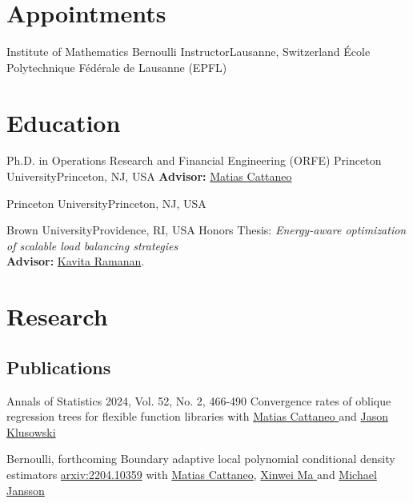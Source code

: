 \documentclass[10pt,a4paper,roman]{moderncv}        %
\begin{document}
\makecvtitle

\vspace{-0.7cm}
\section{Appointments}
{Institute of Mathematics}
{Bernoulli Instructor}{Lausanne, Switzerland}
{École Polytechnique Fédérale de Lausanne (EPFL)}
{}
\section{Education}
{Ph.D. in Operations Research and Financial Engineering (ORFE)}
{Princeton University}{Princeton, NJ, USA}{}
{\textbf{Advisor: }\color{blue}\href{https://cattaneo.princeton.edu}{Matias Cattaneo}\color{black}}

{Princeton University}{Princeton, NJ, USA}{}{}

{Brown University}{Providence, RI, USA}{}{ Honors Thesis: \textit{Energy-aware optimization of scalable load balancing
    strategies}
  \\
  \textbf{Advisor:}
  \color{blue}\href{https://www.brown.edu/academics/applied-mathematics/faculty/kavita-ramanan/home}
  {Kavita Ramanan}\color{black}.}  %

\section{Research}
\subsection{Publications}
\cventry{}
{Annals of Statistics 2024, Vol. 52, No. 2, 466-490}
{Convergence rates of oblique regression trees for flexible function libraries}
{}
{}
{with
  \color{blue}\href{https://cattaneo.princeton.edu}{Matias Cattaneo }\color{black} and
  \color{blue}\href{https://klusowski.princeton.edu}{Jason Klusowski}}

\cventry{}
{Bernoulli, forthcoming}
{Boundary adaptive local polynomial conditional density estimators}
{\color{blue}\href{https://arxiv.org/abs/2204.10359}{arxiv:2204.10359}\color{black}}
{}
{with \color{blue}\href{https://cattaneo.princeton.edu}{Matias Cattaneo}\color{black},
  \color{blue}\href{https://sites.google.com/view/xinweima/home?authuser=0}{Xinwei
    Ma }\color{black}
  and
  \color{blue}\href{https://sites.google.com/berkeley.edu/michael-jansson/}{Michael
    Jansson}\color{black}
}
\end{document}
